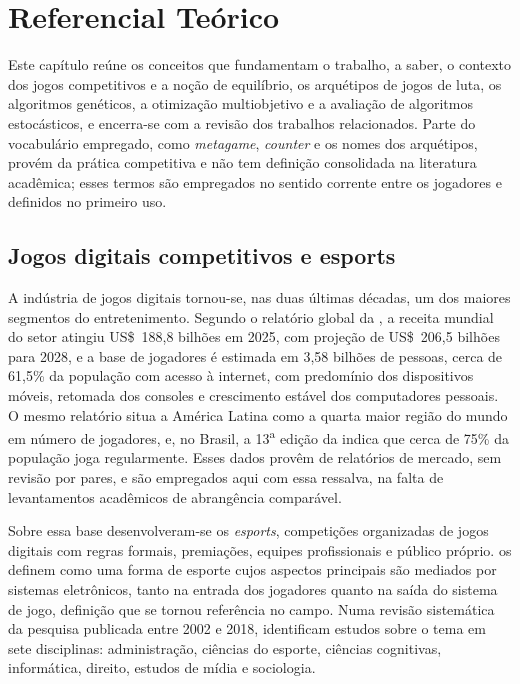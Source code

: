 \chapter[Referencial Teórico]{Referencial Teórico}
\label{chap: fundamentacao}

Este capítulo reúne os conceitos que fundamentam o trabalho, a saber, o contexto dos jogos competitivos e a noção de equilíbrio, os arquétipos de jogos de luta, os algoritmos genéticos, a otimização multiobjetivo e a avaliação de algoritmos estocásticos, e encerra-se com a revisão dos trabalhos relacionados. Parte do vocabulário empregado, como \textit{metagame}, \textit{counter} e os nomes dos arquétipos, provém da prática competitiva e não tem definição consolidada na literatura acadêmica; esses termos são empregados no sentido corrente entre os jogadores e definidos no primeiro uso.

\section{Jogos digitais competitivos e esports}
\label{sec: mercado}

A indústria de jogos digitais tornou-se, nas duas últimas décadas, um dos maiores segmentos do entretenimento. Segundo o relatório global da , a receita mundial do setor atingiu US\$~188{,}8 bilhões em 2025, com projeção de US\$~206{,}5 bilhões para 2028, e a base de jogadores é estimada em 3{,}58 bilhões de pessoas, cerca de 61{,}5\% da população com acesso à internet, com predomínio dos dispositivos móveis, retomada dos consoles e crescimento estável dos computadores pessoais. O mesmo relatório situa a América Latina como a quarta maior região do mundo em número de jogadores, e, no Brasil, a 13\textsuperscript{a} edição da  indica que cerca de 75\% da população joga regularmente. Esses dados provêm de relatórios de mercado, sem revisão por pares, e são empregados aqui com essa ressalva, na falta de levantamentos acadêmicos de abrangência comparável.

Sobre essa base desenvolveram-se os \textit{esports}, competições organizadas de jogos digitais com regras formais, premiações, equipes profissionais e público próprio.  os definem como uma forma de esporte cujos aspectos principais são mediados por sistemas eletrônicos, tanto na entrada dos jogadores quanto na saída do sistema de jogo, definição que se tornou referência no campo. Numa revisão sistemática da pesquisa publicada entre 2002 e 2018,  identificam estudos sobre o tema em sete disciplinas: administração, ciências do esporte, ciências cognitivas, informática, direito, estudos de mídia e sociologia.

